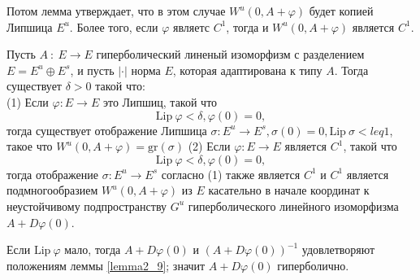 \begin{demo}
$$$$
Потом лемма утверждает, что в этом случае $W^u(0,A+\varphi)$ будет копией Липшица $E^u$. Более того, если $\varphi$ являетс $C^1$, тогда и $W^u(0, A + \varphi)$ является $C^1$.
\begin{lemma}
\label{lemma2_17}
Пусть $A \ : \ E \rightarrow E$ гиперболический линеный изоморфизм с разделением $E = E^u \oplus E^s$, и пусть $|\cdot|$ норма $E$, которая адаптирована к типу $A$. Тогда существует $\delta > 0$ такой что: \\
(1) Если $\varphi : E \rightarrow E$ это Липшиц, такой что 
$$
\mathrm{Lip} \ \varphi < \delta, \varphi(0) = 0,
$$
тогда существует отображение Липшица $\sigma: E^u \rightarrow E^s, \sigma(0)=0, \mathrm{Lip} \ \sigma <leq 1$, такое что $W^u(0,A + \varphi) = \mathrm{gr}(\sigma)$ 
(2) Если $\varphi : E \rightarrow E$ является $C^1$, такой что 
$$
\mathrm{Lip} \ \varphi < \delta, \varphi(0) = 0,
$$
тогда отображение $\sigma : E^u \rightarrow E^s$ согласно (1) также является $C^1$ и $C^1$ является подмногообразием $W^u(0, A + \varphi)$ из $E$ касательно в начале координат к неустойчивому подпространству $G^u$ гиперболического линейного изоморфизма $A + D\varphi(0)$.
\end{lemma}
\remark Если $\mathrm{Lip} \ \varphi$ мало, тогда $A+D\varphi(0)$ и $(A+D\varphi(0))^{-1}$ удовлетворяют положениям леммы \ref{lemma2_9}; значит $A+D\varphi(0)$ гиперболично.

\end{demo}
 


